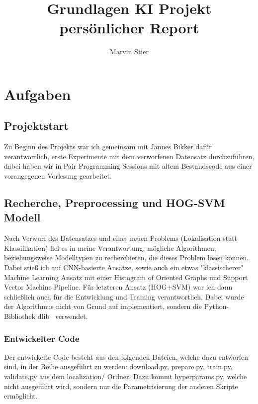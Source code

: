\documentclass[runningheads]{llncs}
\begin{document}
\title{Grundlagen KI Projekt persönlicher Report}

\author{Marvin Stier}



\maketitle

\section{Aufgaben}
\subsection{Projektstart}
Zu Beginn des Projekts war ich gemeinsam mit Jannes Bikker dafür verantwortlich, erste Experimente mit dem verworfenen Datensatz durchzuführen, dabei haben wir in Pair Programming Sessions mit altem Bestandscode aus einer vorangegenen Vorlesung gearbeitet.

\subsection{Recherche, Preprocessing und HOG-SVM Modell}
Nach Verwurf des Datensatzes und eines neuen Problems (Lokalisation statt Klassifikation) fiel es in meine Verantwortung, mögliche Algorithmen, beziehungsweise Modelltypen zu recherchieren, die dieses Problem lösen können. Dabei stieß ich auf CNN-basierte Ansätze, sowie auch ein etwas "klassischerer" Machine Learning Ansatz mit einer Histogram of Oriented Graphs und Support Vector Machine Pipeline. Für letzteren Ansatz (HOG+SVM) war ich dann schließlich auch für die Entwicklung und Training verantwortlich. Dabei wurde der Algorithmus nicht von Grund auf implementiert, sondern die Python-Bibliothek dlib~\cite{ref_dlib_docs} verwendet.

\subsubsection{Entwickelter Code} Der entwickelte Code besteht aus den folgenden Dateien, welche dazu entworfen sind, in der Reihe ausgeführt zu werden: download.py, prepare.py, train.py, validate.py aus dem localization/ Ordner. Dazu kommt hyperparams.py, welche nicht ausgeführt wird, sondern nur die Parametrisierung der anderen Skripte ermöglicht.
\end{document}
